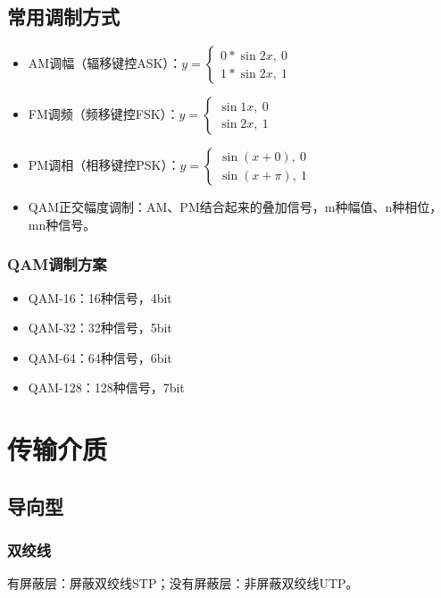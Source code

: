 \subsection{常用调制方式}
\begin{itemize}
    \item AM调幅（辐移键控ASK）：\(y = \begin{cases}
        0 * \sin2x,\ 0 \\ 
        1 * \sin2x,\ 1
    \end{cases}\)
    \item FM调频（频移键控FSK）：\(y = \begin{cases}
        \sin1x,\ 0 \\ 
        \sin2x,\ 1
    \end{cases}\)
    \item PM调相（相移键控PSK）：\(y = \begin{cases}
        \sin(x + 0),\ 0 \\ 
        \sin(x + \pi),\ 1
    \end{cases}\)
    \item QAM正交幅度调制：AM、PM结合起来的叠加信号，m种幅值、n种相位，mn种信号。
\end{itemize}

\subsubsection{QAM调制方案}
\begin{itemize}
    \item QAM-16：16种信号，4bit
    \item QAM-32：32种信号，5bit
    \item QAM-64：64种信号，6bit
    \item QAM-128：128种信号，7bit
\end{itemize}


\section{传输介质}

\subsection{导向型}

\subsubsection{双绞线}
有屏蔽层：屏蔽双绞线STP；没有屏蔽层：非屏蔽双绞线UTP。

